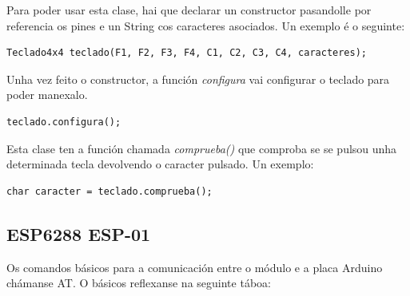 \documentclass[11pt,twoside]{book}
\begin{document}
Para poder usar esta clase, hai que declarar un constructor pasandolle por referencia os pines e un String cos caracteres asociados. Un exemplo é o seguinte:

\begin{verbatim}
Teclado4x4 teclado(F1, F2, F3, F4, C1, C2, C3, C4, caracteres);
\end{verbatim}

Unha vez feito o constructor, a función \textit{configura} vai configurar o teclado para poder manexalo.

\begin{verbatim}
teclado.configura();
\end{verbatim}

Esta clase ten a función chamada \textit{comprueba()} que comproba se se pulsou unha determinada tecla devolvendo o caracter pulsado. Un exemplo:

\begin{verbatim}
char caracter = teclado.comprueba();
\end{verbatim}


\subsection{ESP6288 ESP-01}

Os comandos básicos para a comunicación entre o módulo e a placa Arduino chámanse AT. O básicos reflexanse na seguinte táboa:
\end{document}
